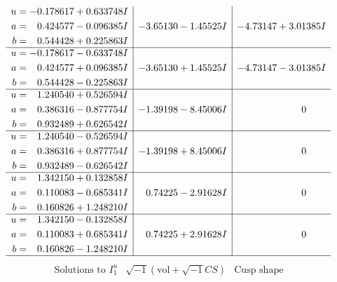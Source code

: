 \documentclass[1p]{elsarticle_modified}
\theoremstyle{definition}
\newcommand{\I}{\sqrt{-1}}
\begin{document}
$$\begin{array}{c|c|c}
\begin{aligned}
u &= -0.178617 + 0.633748 I \\
a &= \phantom{-}0.424577 - 0.096385 I \\
b &= \phantom{-}0.544428 + 0.225863 I\end{aligned}
 & -3.65130 - 1.45525 I & -4.73147 + 3.01385 I \\ \hline\begin{aligned}
u &= -0.178617 - 0.633748 I \\
a &= \phantom{-}0.424577 + 0.096385 I \\
b &= \phantom{-}0.544428 - 0.225863 I\end{aligned}
 & -3.65130 + 1.45525 I & -4.73147 - 3.01385 I \\ \hline\begin{aligned}
u &= \phantom{-}1.240540 + 0.526594 I \\
a &= \phantom{-}0.386316 - 0.877754 I \\
b &= \phantom{-}0.932489 + 0.626542 I\end{aligned}
 & -1.39198 - 8.45006 I & \phantom{-0.000000 } 0 \\ \hline\begin{aligned}
u &= \phantom{-}1.240540 - 0.526594 I \\
a &= \phantom{-}0.386316 + 0.877754 I \\
b &= \phantom{-}0.932489 - 0.626542 I\end{aligned}
 & -1.39198 + 8.45006 I & \phantom{-0.000000 } 0 \\ \hline\begin{aligned}
u &= \phantom{-}1.342150 + 0.132858 I \\
a &= \phantom{-}0.110083 - 0.685341 I \\
b &= \phantom{-}0.160826 + 1.248210 I\end{aligned}
 & \phantom{-}0.74225 - 2.91628 I & \phantom{-0.000000 } 0 \\ \hline\begin{aligned}
u &= \phantom{-}1.342150 - 0.132858 I \\
a &= \phantom{-}0.110083 + 0.685341 I \\
b &= \phantom{-}0.160826 - 1.248210 I\end{aligned}
 & \phantom{-}0.74225 + 2.91628 I & \phantom{-0.000000 } 0\\
 \hline 
 \end{array}$$\newpage$$\begin{array}{c|c|c}  
\text{Solutions to }I^u_{1}& \I (\text{vol} + \sqrt{-1}CS) & \text{Cusp shape}\\

\end{array}$$
\end{document}
